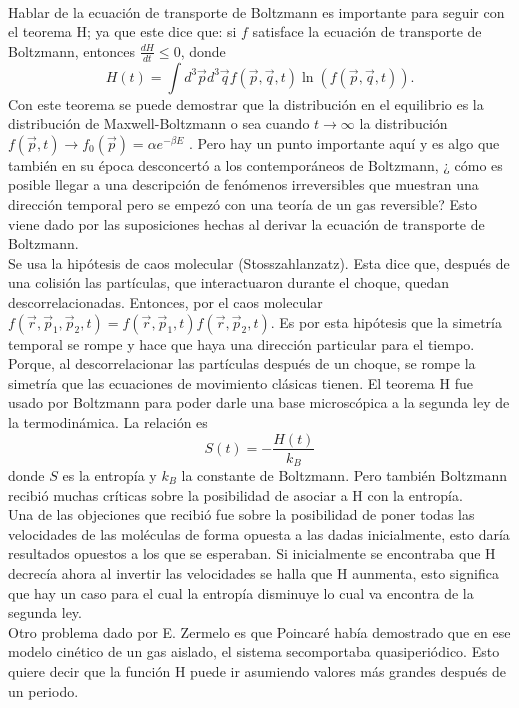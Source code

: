 \\
Hablar de la ecuación de transporte de Boltzmann es importante para seguir con el teorema H; ya que este dice que: si $f$ satisface la ecuación de transporte de Boltzmann, entonces $\frac{dH}{dt} \leq 0$, donde 
\begin{equation}
H(t)= \int d^{3} \vec{p} d^{3} \vec{q}  f(\vec{p},\vec{q},t) \ln (f(\vec{p},\vec{q},t)).
\end{equation}
Con este teorema se puede demostrar que la distribución en el equilibrio es la distribución de Maxwell-Boltzmann o sea cuando $t \to \infty$ la distribución  $f(\vec{p},t) \to f_{0}(\vec{p})=  \alpha e^{-\beta E}$ \cite{HuangStat}. Pero hay un punto importante aquí y es algo que también en su época desconcertó a los contemporáneos de Boltzmann, ¿ cómo es posible llegar a una descripción de fenómenos irreversibles que muestran una dirección temporal pero se empezó con una teoría de un gas reversible? Esto viene dado por las suposiciones hechas al derivar la ecuación de transporte de Boltzmann.
\\
Se usa la hipótesis de caos molecular (Stosszahlanzatz). Esta dice que, después de una colisión las partículas, que interactuaron durante el choque, quedan descorrelacionadas. Entonces, por el caos molecular $f(\vec{r},\vec{p}_{1},\vec{p}_{2},t)=f(\vec{r},\vec{p}_{1},t)f(\vec{r},\vec{p}_{2},t)$. Es por esta hipótesis que la simetría temporal se rompe y hace que haya una dirección particular para el tiempo. Porque, al descorrelacionar las partículas después de un choque, se rompe la simetría que las ecuaciones de movimiento clásicas tienen.
El teorema H fue usado por Boltzmann para poder darle una base microscópica a la segunda ley de la termodinámica. La relación es 
\begin{equation}
S(t)=- \frac{H(t)}{k_{B}}
\end{equation}
donde $S$ es la entropía y $k_{B}$ la constante de Boltzmann. Pero también Boltzmann recibió muchas críticas sobre  la posibilidad de asociar a H con la entropía.
\\
Una de las objeciones que recibió fue sobre la posibilidad de poner todas las velocidades de las moléculas de forma opuesta a las dadas inicialmente, esto daría resultados opuestos a los que se esperaban. Si inicialmente se encontraba que H decrecía ahora al invertir las velocidades se halla que H aunmenta, esto significa que hay un caso para el cual la entropía disminuye lo cual va encontra de la segunda ley. 
\\
Otro problema dado por E. Zermelo es que Poincaré había demostrado que en ese modelo cinético de un gas aislado, el sistema secomportaba quasiperiódico. Esto quiere decir que la función H puede ir asumiendo valores más grandes después de un periodo. 
\\
